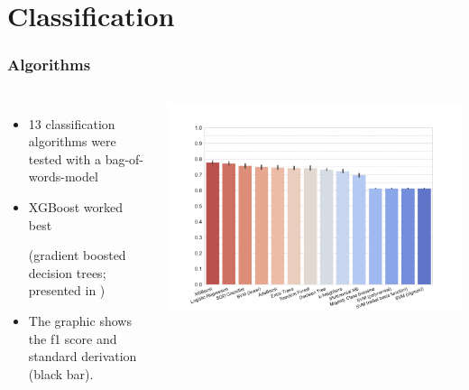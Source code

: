 \documentclass[11pt,aspectratio=169,usenames,dvipsnames]{beamer}
\begin{document}
    \section{Classification}
    \frame{\sectionpage}
    \begin{frame}[t]
        \frametitle{Algorithms}
        \begin{columns}[t]
            \column{2in}
            \begin{itemize}
                \item 13 classification algorithms were tested with a bag-of-words-model
                \item XGBoost worked best
                \begin{scriptsize}
                    (gradient boosted decision trees; presented in \cite{DBLP:journals/corr/ChenG16})
                \end{scriptsize}
                \item  The graphic shows the f1 score and standard derivation (black bar).
            \end{itemize}
            \column{3.5in}

            \includegraphics[scale=0.35,trim={1cm 0 0 5.45cm},clip]{images/classifier.pdf}


        \end{columns}
    \end{frame}
\end{document}
